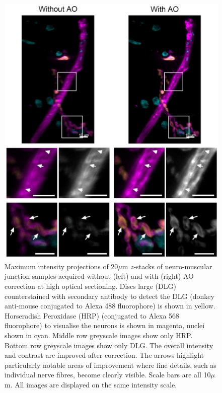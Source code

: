 \begin{figure}[h]
	\centering
	\includegraphics[width=\textwidth]{images/Aurox_NMJ_composite_grey_and_color.jpg}
	\caption[\textit{Drosophila} neuro-muscular junction data acquired on the Aurox imaging 
	system]{Maximum intensity projections of 20$\mu$m $z$-stacks of 
		neuro-muscular junction samples acquired without (left) and with 
		(right) AO correction at high optical sectioning. Discs large (DLG) 
		counterstained with secondary antibody to detect the DLG (donkey 
		anti-mouse conjugated to Alexa 488 fluorophore) is shown in 
		yellow. Horseradish Peroxidase (HRP) (conjugated to Alexa 568 
		fluorophore) to visualise the neurons is shown in magenta, nuclei 
		shown in cyan. Middle row greyscale images show only HRP. Bottom row 
		greyscale images show only DLG. The overall intensity and contrast 
		are improved after correction. The arrows highlight particularly 
		notable areas of improvement where fine details, such as individual 
		nerve fibres, become clearly visible. Scale bars are all 10$\mu$m. 
		All images are displayed on the same intensity scale.}
	\label{fig:Aurox_NMJ_composite_grey_and_color}
\end{figure}
